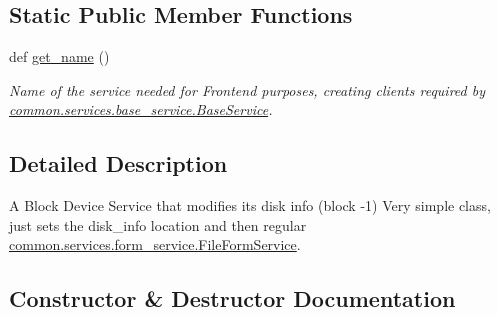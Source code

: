 \subsection*{Static Public Member Functions}
\begin{DoxyCompactItemize}
\item 
def \hyperlink{class_r_a_i_d5_1_1block__device_1_1services_1_1set__disk__info__service_1_1_set_disk_info_service_a72eea80f2a7dea81f2a9b3afcb0e67a2}{get\+\_\+name} ()
\begin{DoxyCompactList}\small\item\em Name of the service needed for Frontend purposes, creating clients required by \hyperlink{class_r_a_i_d5_1_1common_1_1services_1_1base__service_1_1_base_service}{common.\+services.\+base\+\_\+service.\+Base\+Service}. \end{DoxyCompactList}\end{DoxyCompactItemize}


\subsection{Detailed Description}
A Block Device Service that modifies it\textquotesingle{}s disk info (block -\/1) Very simple class, just sets the disk\+\_\+info location and then regular \hyperlink{class_r_a_i_d5_1_1common_1_1services_1_1form__service_1_1_file_form_service}{common.\+services.\+form\+\_\+service.\+File\+Form\+Service}. 



\subsection{Constructor \& Destructor Documentation}
\mbox{\label{class_r_a_i_d5_1_1block__device_1_1services_1_1set__disk__info__service_1_1_set_disk_info_service_a475d7ba1551735748b5a226e0113fbd7}} 
